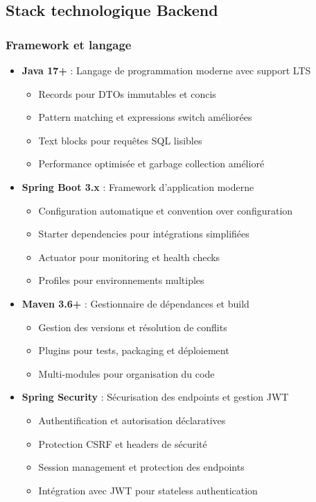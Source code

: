 \documentclass[12pt,a4paper]{report}
\begin{document}
\subsection{Stack technologique Backend}

\subsubsection{Framework et langage}
\begin{itemize}
\item \textbf{Java 17+} : Langage de programmation moderne avec support LTS

  \begin{itemize}
  \item Records pour DTOs immutables et concis
  \item Pattern matching et expressions switch améliorées
  \item Text blocks pour requêtes SQL lisibles
  \item Performance optimisée et garbage collection amélioré
  \end{itemize}
\item \textbf{Spring Boot 3.x} : Framework d'application moderne
  \begin{itemize}
  \item Configuration automatique et convention over configuration
  \item Starter dependencies pour intégrations simplifiées
  \item Actuator pour monitoring et health checks
  \item Profiles pour environnements multiples
  \end{itemize}
\item \textbf{Maven 3.6+} : Gestionnaire de dépendances et build
  \begin{itemize}
  \item Gestion des versions et résolution de conflits
  \item Plugins pour tests, packaging et déploiement
  \item Multi-modules pour organisation du code
  \end{itemize}
\item \textbf{Spring Security} : Sécurisation des endpoints et gestion JWT

  \begin{itemize}
  \item Authentification et autorisation déclaratives
  \item Protection CSRF et headers de sécurité
  \item Session management et protection des endpoints
  \item Intégration avec JWT pour stateless authentication
  \end{itemize}
\end{itemize}
\end{document}
